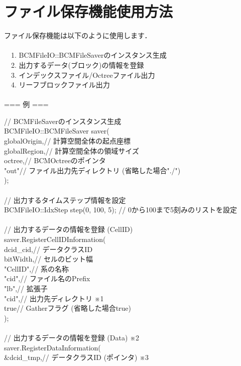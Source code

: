 \documentclass[twoside]{jbook}
\begin{document}
\section{ファイル保存機能使用方法}
ファイル保存機能は以下のように使用します． \\
 \\
　1. BCMFileIO::BCMFileSaverのインスタンス生成 \\
　2. 出力するデータ(ブロック)の情報を登録 \\
　3. インデックスファイル/Octreeファイル出力 \\
　4. リーフブロックファイル出力 \\
 \\
=== 例 === \\
\begin{tabbing}
// BCMFileSaverのインスタンス生成 \\
BCMF\=ileIO::BCMFileSaver saver(\= \\
\>globalOrigin,\>// 計算空間全体の起点座標 \\
\>globalRegion,\>// 計算空間全体の領域サイズ \\
\>octree,\>// BCMOctreeのポインタ \\
\>"out"\>// ファイル出力先ディレクトリ (省略した場合"./") \\
); \\
 \\
// 出力するタイムステップ情報を設定 \\
BCMFileIO::IdxStep step(0, 100, 5);  // 0から100まで5刻みのリストを設定 \\
 \\
// 出力するデータの情報を登録 (CellID) \\
saver.RegisterCellIDInformation(\\
\>dcid\_cid,\>// データクラスID \\
\>bitWidth,\>// セルのビット幅 \\
\>"CellID",\>// 系の名称 \\
\>"cid",\>// ファイル名のPrefix \\
\>"lb",\>// 拡張子 \\
\>"cid",\>// 出力先ディレクトリ ※1 \\
\>true\>// Gatherフラグ (省略した場合true) \\
); \\
 \\
// 出力するデータの情報を登録 (Data) ※2 \\
saver.RegisterDataInformation(\\
\>\&dcid\_tmp,\>// データクラスID (ポインタ) ※3 \\

\end{tabbing}
\end{document}
